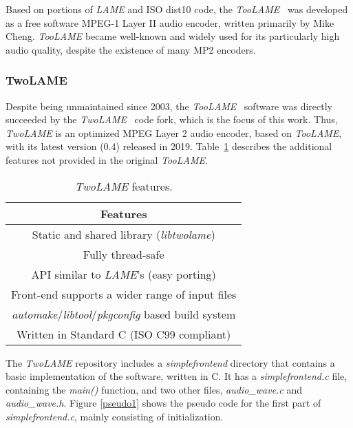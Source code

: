 Based on portions of \textit{LAME} and ISO dist10 code, the \textit{TooLAME}~\cite{toolame} was developed as a free software MPEG-1 Layer II audio encoder, written primarily by Mike Cheng. \textit{TooLAME} became well-known and widely used for its particularly high audio quality, despite the existence of many MP2 encoders.

\subsubsection{TwoLAME}

Despite being unmaintained since 2003, the \textit{TooLAME}~\cite{toolame} software was directly succeeded by the \textit{TwoLAME}~\cite{twolame} code fork, which is the focus of this work.
Thus, \textit{TwoLAME} is an optimized MPEG Layer 2 audio encoder, based on \textit{TooLAME}, with its latest version (0.4) released in 2019. 
Table~\ref{tab:twolame} describes the additional features not provided in the original \textit{TooLAME}.

\vspace{0.5cm}

\begin{table}[H]
    \centering
    \begin{tabular}{|c|}
        \hline
        \textbf{Features} \\
        \hline
         Static and shared library (\textit{libtwolame}) \\
         \hline
         Fully thread-safe\\
         \hline
         API similar to \textit{LAME}'s (easy porting) \\
         \hline
         Front-end supports a wider range of input files \\
         \hline
         \textit{automake}/\textit{libtool}/\textit{pkgconfig} based build system \\
         \hline
         Written in Standard C (ISO C99 compliant)\\
         \hline
    \end{tabular}
    \caption{\textit{TwoLAME} features.}
    \label{tab:twolame}
\end{table}

The \textit{TwoLAME} repository includes a \textit{simplefrontend} directory that contains a basic implementation of the software, written in C.
It has a \textit{simplefrontend.c} file, containing the \textit{main()} function, and two other files, \textit{audio\_wave.c} and \textit{audio\_wave.h}.
Figure \ref{pseudo1} shows the pseudo code for the first part of \textit{simplefrontend.c}, mainly consisting of initialization.

